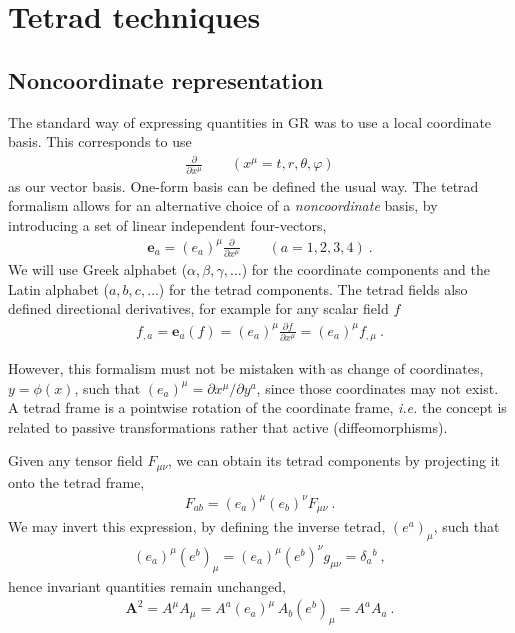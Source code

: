 
\chapter{Tetrad techniques} %
\label{AppendixTetradFormalism}


\section{Noncoordinate representation}
\label{AppendixTetradMetric}

The standard way of expressing quantities in GR was to use a local coordinate basis. This corresponds to use
\begin{align}
    \frac{\partial}{\partial x^\mu} \qquad (x^\mu = t, r, \theta, \varphi)
\end{align}
as our vector basis. One-form basis can be defined the usual way. The tetrad formalism allows for an alternative choice of a \emph{noncoordinate} basis, by introducing a set of linear independent four-vectors, 
\begin{align}
    \bm{e}_a = (e_a)^\mu \frac{\partial}{\partial x^\mu} \qquad (a = 1, 2, 3, 4) ~.
\end{align}
We will use Greek alphabet ($\alpha,\beta,\gamma,\dots$) for the coordinate components and the Latin alphabet ($a,b,c,\dots$) for the tetrad components.
The tetrad fields also defined directional derivatives, for example for any scalar field $f$
\begin{align}
    f_{, a} = \bm{e}_a ( f ) = (e_a)^\mu \frac{\partial f}{\partial x^\mu} =  (e_a)^\mu f_{,  \mu}  ~.
\end{align}

However, this formalism must not be mistaken with as change of coordinates, $y=\phi(x)$, such that $(e_a)^\mu = \partial x^\mu / \partial y^a$, since those coordinates may not exist.
A tetrad frame is a pointwise rotation of the coordinate frame, \emph{i.e.} the concept is related to passive transformations rather that active (diffeomorphisms).

Given any tensor field $F_{\mu\nu}$, we can obtain its tetrad components by projecting it onto the tetrad frame,
\begin{align}
    F_{ab} = (e_a)^\mu (e_b)^\nu F_{\mu\nu} ~.
\end{align}
We may invert this expression, by defining the inverse tetrad, $(e^a)_\mu$, such that
\begin{align}
    (e_a)^\mu (e^b)_\mu = (e_a)^\mu (e^b)^\nu g_{\mu\nu} = \delta_a{}^b ~,
\end{align}
hence invariant quantities remain unchanged,
\begin{align}
    \bm{A}^2 = A^\mu A_\mu = A^a (e_a)^\mu \, A_b (e^b)_\mu = A^a A_a~.
\end{align}

